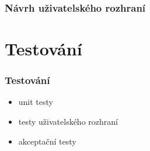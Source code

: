 \documentclass{beamer}
\begin{document}
\begin{frame}
  \frametitle{Návrh uživatelského rozhraní}

  \begin{figure}[H]

    \centering
    \hfil

    \label{pic:prototype_ui}
  \end{figure}
\end{frame}

\section{Testování}

\begin{frame}
  \frametitle{Testování}
  \begin{itemize}
    \item unit testy
    \item testy uživatelského rozhraní
    \item akceptační testy
  \end{itemize}
\end{frame}
\end{document}
